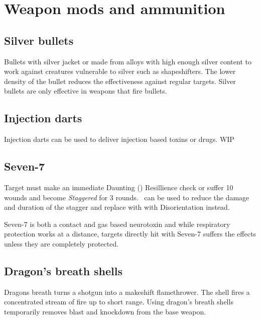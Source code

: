 \documentclass{book}
\begin{document}
\section{Weapon mods and ammunition}
\begin{multicols}{2}
	\subsection{Silver bullets}\label{silver}
	Bullets with silver jacket or made from alloys with high enough silver content to work against creatures vulnerable to silver such as shapeshifters. The lower density of the bullet reduces the effectiveness against regular targets. Silver bullets are only effective in weapons that fire bullets.
	
	\subsection{Injection darts}
	Injection darts can be used to deliver injection based toxins or drugs. WIP
	
	\subsection{Seven-7}
	Target must make an immediate Daunting (\DifficultyDie \DifficultyDie \DifficultyDie \DifficultyDie) Resillience check or suffer 10 wounds and become \textit{Staggered} for 3 rounds. \Advantage\ can be used to reduce the damage and duration of the stagger and replace with with Disorientation instead. 
	
	Seven-7 is both a contact and gas based neurotoxin and while respiratory protection works at a distance, targets directly hit with Seven-7 suffers the effects unless they are completely protected.
	
	\subsection{Dragon's breath shells}
	Dragons breath turns a shotgun into a makeshift flamethrower. The shell fires a concentrated stream of fire up to short range. Using dragon's breath shells temporarily removes blast and knockdown from the base weapon. 
	
\end{multicols}
\end{document}
